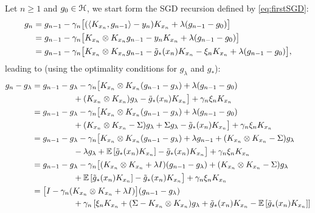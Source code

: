 Let $n \geqslant 1$ and $g_0 \in {\mathcal H}$, we start form the SGD recursion defined by \eqref{eq:firstSGD}:
\begin{align*}
{g}_n 
 & = {g}_{n-1} - \gamma_n  \big[ ( \langle K_{x_n} ,  {g}_{n-1}\rangle - y_n)K_{x_n}   + \lambda ({g}_{n-1} - g_0) \big] \\
 & = {g}_{n-1} - \gamma_n \big[ K_{x_n} \otimes K_{x_n} {g}_{n-1} - y_n K_{x_n}  + \lambda ({g}_{n-1} - g_0) \big] \\
 & = {g}_{n-1} - \gamma_n \big[ K_{x_n} \otimes K_{x_n} {g}_{n-1} - \tilde{g}_*(x_n) K_{x_n} - \xi_n K_{x_n} + \lambda ({g}_{n-1} - g_0) \big] ,
 \end{align*}
 leading to (using the optimality conditions for $g_\lambda$ and $g_\ast$):
 \begin{align*}
{g}_n - g_\lambda 
  & =  {g}_{n-1} - g_\lambda - \gamma_n \big[ K_{x_n} \otimes K_{x_n} ( {g}_{n-1} - g_\lambda) + \lambda ({g}_{n-1} - g_0)  \\
   &   \hspace*{1.77cm} + (K_{x_n} \otimes K_{x_n}) g_\lambda - \Phg(x_n) K_{x_n} \big] + \gamma_n \xi_n K_{x_n} \\
 & = {g}_{n-1} - g_\lambda
 - \gamma_n \big[ K_{x_n} \otimes K_{x_n} ( {g}_{n-1} - g_\lambda)  + \lambda ({g}_{n-1} - g_0) \\
 &   \hspace*{1.77cm} 
 + (K_{x_n} \otimes K_{x_n} - \Sigma) g_\lambda + \Sigma g_\lambda  - \Phg(x_n) K_{x_n} \big] + \gamma_n \xi_n K_{x_n}\\
  & =  {g}_{n-1} - g_\lambda
 - \gamma_n \big[ K_{x_n} \otimes K_{x_n} ( {g}_{n-1} - g_\lambda)  + \lambda {g}_{n-1} 
 + (K_{x_n} \otimes K_{x_n} - \Sigma) g_\lambda \\
&   \hspace*{1.77cm} -\lambda g_\lambda + \E \left[ \Phg(x_n) K_{x_n} \right] - \Phg(x_n) K_{x_n} \big] + \gamma_n \xi_n K_{x_n}\\
 & =  {g}_{n-1} - g_\lambda
 - \gamma_n \big[ (  K_{x_n} \otimes K_{x_n} + \lambda I)( {g}_{n-1} - g_\lambda)   + (K_{x_n} \otimes K_{x_n} - \Sigma) g_\lambda \\
 &  \hspace*{1.77cm} +   \E \left[ \Phg(x_n) K_{x_n} \right] - \Phg(x_n) K_{x_n}   \big] + \gamma_n \xi_n K_{x_n}\\
& =  \big[
I - \gamma_n   (  K_{x_n} \otimes K_{x_n} + \lambda I ) \big]
  ( {g}_{n-1} - g_\lambda ) \\
&    \hspace*{1.77cm}   + \gamma_n \left[  \xi_n K_{x_n} +  ( \Sigma- K_{x_n} \otimes K_{x_n}) g_\lambda +   \Phg(x_n) K_{x_n} - \E \left[ \Phg(x_n) K_{x_n} \right] \right] \\ 

\end{align*}
